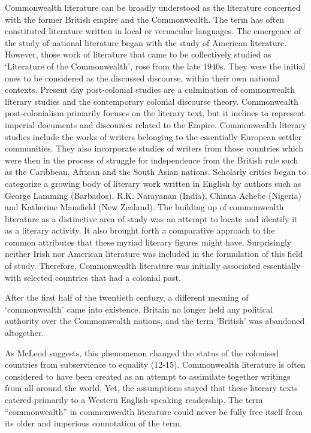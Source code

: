 Commonwealth literature can be broadly understood as the literature concerned with the former British empire and the Commonwealth. The term has often constituted literature written in local or vernacular languages. The emergence of the study of national literature began with the study of American literature. However, those work of literature that came to be collectively studied as ‘Literature of the Commonwealth’, rose from the late 1940s. They were the initial ones to be considered as the discussed discourse, within their own national contexts. Present day post-colonial studies are a culmination of commonwealth literary studies and the contemporary colonial discourse theory. Commonwealth post-colonialism primarily focuses on the literary text, but it inclines to represent imperial documents and discourses related to the Empire. Commonwealth literary studies include the works of writers belonging to the essentially European settler communities. They also incorporate studies of writers from those countries which were then in the process of struggle for independence from the British rule such as the Caribbean, African and the South Asian nations. Scholarly critics began to categorize a growing body of literary work written in English by authors such as George Lamming (Barbados), R.K. Narayanan (India), Chinua Achebe (Nigeria) and Katherine Mansfield (New Zealand). The building up of commonwealth literature as a distinctive area of study was an attempt to locate and identify it as a literary activity. It also brought forth a comparative approach to the common attributes that these myriad literary figures might have. Surprisingly neither Irish nor American literature was included in the formulation of this field of study. Therefore, Commonwealth literature was initially associated essentially with selected countries that had a colonial past. 

After the first half of the twentieth century, a different meaning of ‘commonwealth’ came into existence. Britain no longer held any political authority over the Commonwealth nations, and the term ‘British’ was abandoned altogether.

As McLeod suggests, this phenomenon changed the status of the colonised countries from subservience to equality (12-15). Commonwealth literature is often considered to have been created as an attempt to assimilate together writings from all around the world. Yet, the assumptions stayed that these literary texts catered primarily to a Western English-speaking readership. The term “commonwealth” in commonwealth literature could never be fully free itself from its older and imperious connotation of the term. 

